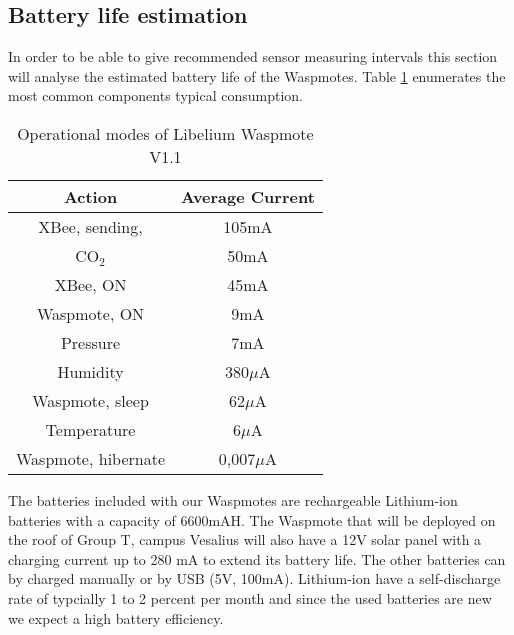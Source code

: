 \subsection{Battery life estimation}
In order to be able to give recommended sensor measuring intervals this section will analyse the estimated battery life of the Waspmotes. Table \ref{tab:cons2} enumerates the most common components typical consumption.
\begin{table}[!ht]
\begin{center}
\begin{tabular}[!ht]{|c|c|}
\hline
\textbf{Action} & \textbf{Average Current}\\
\hline
XBee, sending, & 105mA\\
\hline
CO$_{2}$ & 50mA\\
\hline
XBee, ON & 45mA\\
\hline
Waspmote, ON & 9mA\\
\hline
Pressure & 7mA\\
\hline
Humidity & 380$\mu$A\\
\hline
Waspmote, sleep & 62$\mu$A\\
\hline
Temperature & 6$\mu$A\\
\hline
Waspmote, hibernate & 0,007$\mu$A\\
\hline
\end{tabular}
\caption{Operational modes of Libelium Waspmote V1.1}
\label{tab:cons2}
\end{center}
\end{table}
The batteries included with our Waspmotes are rechargeable Lithium-ion batteries with a capacity of 6600mAH. The Waspmote that will be deployed on the roof of Group T, campus Vesalius will also have a 12V solar panel with a charging current up to 280 mA to extend its battery life. The other batteries can by charged manually or by USB (5V, 100mA). Lithium-ion have a self-discharge rate of typcially 1 to 2 percent per month and since the used batteries are new we expect a high battery efficiency.\\
